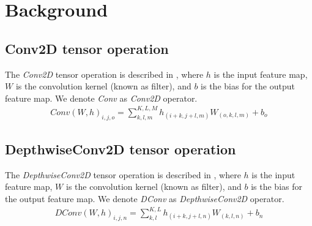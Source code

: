 \section{Background}
\label{sec:background}
\subsection{Conv2D tensor operation}
The \emph{Conv2D} tensor operation is described in , where $h$ is the input feature map, $W$ is the convolution kernel (known as filter), and $b$ is the bias for the output feature map\cite{goodfellow2016deep}. We denote \emph{Conv} as \emph{Conv2D} operator.
\begin{eqnarray} \label{eq:conv2D}
Conv\left(W,h\right)_{i,j,o}=\sum_{k,l,m}^{K,L,M} h_{(i+k,j+l,m)} W_{(o,k,l,m)}+b_{o}
\end{eqnarray} 	
\subsection{DepthwiseConv2D tensor operation}
The \emph{DepthwiseConv2D} tensor operation is described in , where $h$ is the input feature map, $W$ is the convolution kernel (known as filter), and $b$ is the bias for the output feature map. We denote \emph{DConv} as \emph{DepthwiseConv2D} operator.
\begin{eqnarray} \label{eq:dconv2D}
DConv\left(W,h\right)_{i,j,n}=\sum_{k,l}^{K,L} h_{(i+k,j+l,n)} W_{(k,l,n)}+b_{n}
\end{eqnarray}